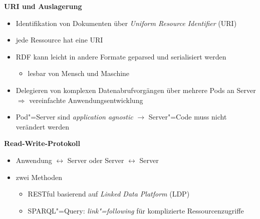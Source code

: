 \textbf{URI und Auslagerung}
\begin{itemize}
    \item Identifikation von Dokumenten über \emph{Uniform Resource Identifier} (URI)~\cite{sambraSolidPlatformDecentralized2016}
    \item jede Ressource hat eine URI
    \item RDF kann leicht in andere Formate geparsed und serialisiert werden~\cite{sambraSolidPlatformDecentralized2016}
    \begin{itemize}
        \item lesbar von Mensch und Maschine
    \end{itemize}
    \item Delegieren von komplexen Datenabrufvorgängen über mehrere Pods an Server $\Rightarrow$ vereinfachte Anwendungsentwicklung~\cite{sambraSolidPlatformDecentralized2016}
    \item Pod"=Server sind \emph{application agnostic} $\to$ Server"=Code muss nicht verändert werden~\cite{sambraSolidPlatformDecentralized2016}
\end{itemize}

\vspace{1cm}

\textbf{Read-Write-Protokoll}
\begin{itemize}
    \item Anwendung $\leftrightarrow$ Server oder Server $\leftrightarrow$ Server~\cite{sambraSolidPlatformDecentralized2016}
    \item zwei Methoden
    \begin{itemize}
        \item RESTful basierend auf \emph{Linked Data Platform} (LDP)
        \item SPARQL"=Query: \emph{link"=following} für komplizierte Ressourcenzugriffe~\cite{sambraSolidPlatformDecentralized2016}
    \end{itemize}
\end{itemize}

\vspace{1cm}


